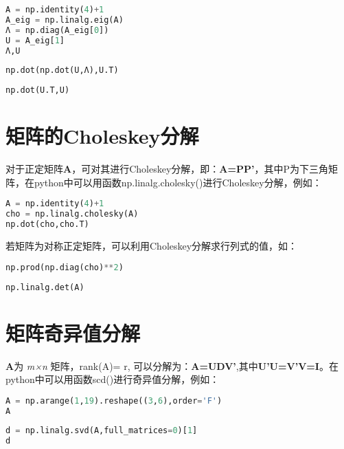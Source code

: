 \documentclass[UTF8,a4paper,12pt]{ctexart}  %
\begin{document}
\begin{lstlisting}[language=Python]
A = np.identity(4)+1
A_eig = np.linalg.eig(A)
Λ = np.diag(A_eig[0])
U = A_eig[1]
Λ,U
\end{lstlisting}

\begin{lstlisting}[language=Python]
np.dot(np.dot(U,Λ),U.T)
\end{lstlisting}

\begin{lstlisting}[language=Python]
np.dot(U.T,U)
\end{lstlisting}

\hypertarget{choleskey}{%
\section{矩阵的Choleskey分解}\label{choleskey}}

对于正定矩阵\textbf{A}，可对其进行Choleskey分解，即：\textbf{A=PP'}，其中P为下三角矩阵，在python中可以用函数np.linalg.cholesky()进行Choleskey分解，例如：

\begin{lstlisting}[language=Python]
A = np.identity(4)+1
cho = np.linalg.cholesky(A)
np.dot(cho,cho.T)
\end{lstlisting}

若矩阵为对称正定矩阵，可以利用Choleskey分解求行列式的值，如：

\begin{lstlisting}[language=Python]
np.prod(np.diag(cho)**2)
\end{lstlisting}

\begin{lstlisting}[language=Python]
np.linalg.det(A)
\end{lstlisting}

\section{矩阵奇异值分解}

\textbf{A}为 \emph{m×n} 矩阵，rank(A)= r, 可以分解为：\textbf{A=UDV'},其中\textbf{U'U=V'V=I}。在python中可以用函数scd()进行奇异值分解，例如：

\begin{lstlisting}[language=Python]
A = np.arange(1,19).reshape((3,6),order='F')
A
\end{lstlisting}

\begin{lstlisting}[language=Python]
d = np.linalg.svd(A,full_matrices=0)[1]
d
\end{lstlisting}
\end{document}
